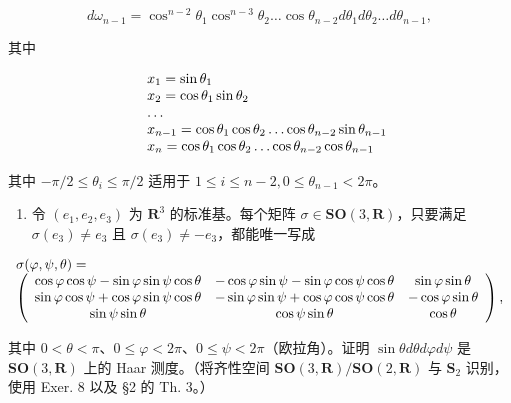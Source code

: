 \[
d \omega_ {n - 1} = \cos^ {n - 2} \theta_ {1} \cos^ {n - 3} \theta_ {2} \dots \cos \theta_ {n - 2} d \theta_ {1} d \theta_ {2} \dots d \theta_ {n - 1},
\]

 其中

\[
\begin{array}{r l} & x _ {1} = \sin \theta_ {1} \\ & x _ {2} = \cos \theta_ {1} \sin \theta_ {2} \\ & \dots \\ & x _ {n - 1} = \cos \theta_ {1} \cos \theta_ {2} \dots \cos \theta_ {n - 2} \sin \theta_ {n - 1} \\ & x _ {n} = \cos \theta_ {1} \cos \theta_ {2} \dots \cos \theta_ {n - 2} \cos \theta_ {n - 1} \end{array}
\]

其中 \(-\pi / 2 \leqslant \theta_{i} \leqslant \pi / 2\) 适用于 \(1 \leqslant i \leqslant n - 2, 0 \leqslant \theta_{n-1} < 2\pi\)。

\begin{enumerate}
\def\labelenumi{\arabic{enumi})}
\setcounter{enumi}{8}
\tightlist
\item
  令 \((e_1, e_2, e_3)\) 为 \(\mathbf{R}^3\) 的标准基。每个矩阵 \(\sigma \in \mathbf{SO}(3, \mathbf{R})\)，只要满足 \(\sigma(e_3) \neq e_3\) 且 \(\sigma(e_3) \neq -e_3\)，都能唯一写成
\end{enumerate}

\[
\begin{array}{l} \sigma (\varphi , \psi , \theta) = \\ \left( \begin{array}{c c c} \cos \varphi   \cos \psi - \sin \varphi   \sin \psi   \cos \theta & - \cos \varphi   \sin \psi - \sin \varphi   \cos \psi   \cos \theta & \sin \varphi   \sin \theta \\ \sin \varphi   \cos \psi + \cos \varphi   \sin \psi   \cos \theta & - \sin \varphi   \sin \psi + \cos \varphi   \cos \psi   \cos \theta & - \cos \varphi   \sin \theta \\ \sin \psi   \sin \theta & \cos \psi   \sin \theta & \cos \theta \end{array} \right), \end{array}
\]

其中 \(0 < \theta < \pi\)、\(0 \leqslant \varphi < 2\pi\)、\(0 \leqslant \psi < 2\pi\)（欧拉角）。证明 \(\sin \theta d\theta d\varphi d\psi\) 是 \(\mathbf{SO}(3, \mathbf{R})\) 上的 Haar 测度。（将齐性空间 \(\mathbf{SO}(3, \mathbf{R}) / \mathbf{SO}(2, \mathbf{R})\) 与 \(\mathbf{S}_2\) 识别，使用 Exer. 8 以及 §2 的 Th. 3。）

